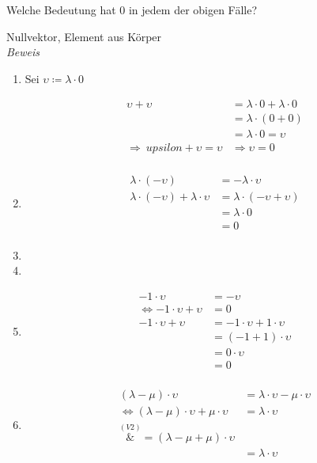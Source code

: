\documentclass{article}
\begin{document}
Welche Bedeutung hat $0$ in jedem der obigen Fälle?

{\color{ForestGreen}Nullvektor}, {\color{BurntOrange}Element aus Körper} \\

\emph{Beweis}

\begin{enumerate}[1)]
\item
  Sei $\upsilon \coloneqq \lambda \cdot 0$

  \begin{align*}
    \upsilon + \upsilon &= \lambda \cdot 0 + \lambda \cdot 0 \\
                        &= \lambda \cdot (0 + 0) \\
                        &= \lambda \cdot 0 = \upsilon \\
    \Rightarrow \ upsilon + \upsilon = \upsilon &\Rightarrow \upsilon = 0 \\
  \end{align*}
\item
  \begin{align*}
    \lambda \cdot (- \upsilon) &= -\lambda \cdot \upsilon \\
    \lambda \cdot (- \upsilon) + \lambda \cdot \upsilon &= \lambda \cdot (- \upsilon + \upsilon) \\
                               &= \lambda \cdot 0 \\
                               &= 0\\
  \end{align*}
\item
\item
\item
  \begin{align*}
    -1 \cdot \upsilon &= -\upsilon \\
    \iff -1 \cdot \upsilon + \upsilon &= 0 \\
    -1 \cdot \upsilon + \upsilon &= -1 \cdot \upsilon + 1 \cdot \upsilon \\
                      &= (-1 + 1) \cdot \upsilon \\
                      &= 0 \cdot \upsilon \\
                      &= 0 \\
  \end{align*}
\item
  \begin{align*}
    (\lambda - \mu) \cdot \upsilon                           &= \lambda \cdot \upsilon - \mu \cdot \upsilon \\
    \iff (\lambda - \mu) \cdot \upsilon + \mu \cdot \upsilon &= \lambda \cdot \upsilon \\
    \overset{(V2)}&{=} (\lambda - \mu + \mu) \cdot \upsilon \\
                                                             &= \lambda \cdot \upsilon \\
  \end{align*}
\end{enumerate}
\end{document}
